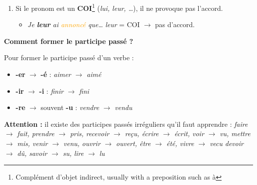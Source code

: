 \documentclass[math,code]{amznotes}
\theoremstyle{remark}
\begin{document}
\begin{enumerate}
\begin{enumerate}
\begin{itemize}
            \item \textit{La DRH a appelé Marion et elle l'a
            \textcolor{orange}{convoquée}.}
            \quad \textit{l'} = Marion, COD avant $\rightarrow$ féminin singulier.
            
            \item \textit{Les lettres qu'il a
            \textcolor{orange}{envoyées}.}
            \quad \textit{que} = les lettres, COD avant $\rightarrow$ féminin pluriel.
        \end{itemize}
        
        \item Si le pronom est un \textbf{COI}\footnote{Complément d'objet indirect, usually with a preposition such as à} (\textit{lui, leur, \dots}),
        il ne provoque pas l'accord.
        \begin{itemize}
            \item \textit{Je \textbf{leur} ai \textcolor{orange}{annoncé} que\dots}
            \quad \textit{leur} = COI $\rightarrow$ pas d'accord.
        \end{itemize}
    \end{enumerate}

    \begin{notebox}
        \textbf{Comment former le participe passé ?}
        
        Pour former le participe passé d'un verbe :
        
        \begin{itemize}
            \item \textbf{-er} $\rightarrow$ \textbf{-é} : \textit{aimer $\rightarrow$ aimé}
            \item \textbf{-ir} $\rightarrow$ \textbf{-i} : \textit{finir $\rightarrow$ fini}
            \item \textbf{-re} $\rightarrow$ souvent \textbf{-u} : \textit{vendre $\rightarrow$ vendu}
        \end{itemize}
        
        \textbf{Attention :} il existe des participes passés irréguliers qu'il faut apprendre :
        \textit{faire $\rightarrow$ fait, prendre $\rightarrow$ pris, recevoir $\rightarrow$ reçu,
        écrire $\rightarrow$ écrit, voir $\rightarrow$ vu, mettre $\rightarrow$ mis, 
        venir $\rightarrow$ venu, ouvrir $\rightarrow$ ouvert, être $\rightarrow$ été, vivre $\rightarrow$ vecu
        devoir $\rightarrow$ dû, savoir $\rightarrow$ su, lire $\rightarrow$ lu}
    \end{notebox}


\end{enumerate}
\end{document}
